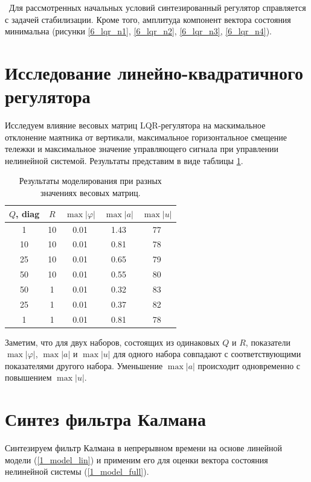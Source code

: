 \newpage
\,
\newpage
Для рассмотренных начальных условий синтезированный регулятор справляется с задачей стабилизации. Кроме того, амплитуда компонент вектора состояния минимальна (рисунки \ref{6_lqr_n1}, \ref{6_lqr_n2}, \ref{6_lqr_n3}, \ref{6_lqr_n4}).

\section{Исследование линейно-квадратичного регулятора}

Исследуем влияние весовых матриц LQR-регулятора на маскимальное отклонение маятника от вертикали, максимальное горизонтальное смещение тележки и максимальное значение управляющего сигнала при управлении нелинейной системой. Результаты представим в виде таблицы \ref{6_tab_1}.

\begin{table}[h]
	\centering
	\caption{Результаты моделирования при разных значениях весовых матриц.}
	\label{6_tab_1}
	\begin{tabular}{ccccc}
		\toprule
		$Q$, diag & $R$ & $\max |\varphi|$ & $\max |a|$ & $\max |u|$ \\
		\midrule
		1  & 10  &  0.01  &  1.43  &  77  \\
		10  & 10 &  0.01  &  0.81  &  78  \\
		25 & 10&  0.01  &  0.65  &  79  \\
		50  &10&   0.01  &  0.55&  80 \\
		50  &1&   0.01  &  0.32 &  83  \\
		25  &1&   0.01  &  0.37 &  82  \\
		1  &1&   0.01  &  0.81 &  78 \\
		\bottomrule
	\end{tabular}
\end{table}

Заметим, что для двух наборов, состоящих из одинаковых $Q$ и $R$, показатели $\max |\varphi|$, $\max |a|$ и $\max |u|$ для одного набора совпадают с соответствующими показателями другого набора. Уменьшение $\max |a|$ происходит одновременно с повышением $\max |u|$.

\section{Синтез фильтра Калмана}
Синтезируем фильтр Калмана в непрерывном времени на основе линейной модели (\ref{1_model_lin}) и применим его для оценки вектора состояния нелинейной системы (\ref{1_model_full}).

